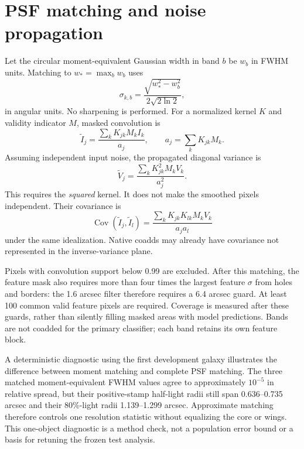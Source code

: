 \documentclass[10pt]{article}
\begin{document}
\section{PSF matching and noise propagation}
Let the circular moment-equivalent Gaussian width in band $b$ be $w_b$ in
FWHM units. Matching to $w_* =\max_b w_b$ uses
\begin{equation}
 \sigma_{k,b}=\frac{\sqrt{w_*^2-w_b^2}}{2\sqrt{2\ln2}},
\end{equation}
in angular units. No sharpening is performed. For a normalized kernel $K$
and validity indicator $M$, masked convolution is
\begin{equation}
 \widetilde I_j=\frac{\sum_k K_{jk}M_kI_k}{a_j},\qquad
 a_j=\sum_k K_{jk}M_k.
\end{equation}
Assuming independent input noise, the propagated diagonal variance is
\begin{equation}
 \widetilde V_j=\frac{\sum_kK_{jk}^2M_kV_k}{a_j^2}.
 \label{eq:variance}
\end{equation}
This requires the \emph{squared} kernel. It does not make the smoothed pixels
independent. Their covariance is
\begin{equation}
 \operatorname{Cov}(\widetilde I_j,\widetilde I_l)
 =\frac{\sum_k K_{jk}K_{lk}M_kV_k}{a_ja_l}
\end{equation}
under the same idealization. Native coadds may already have covariance not
represented in the inverse-variance plane.

Pixels with convolution support below 0.99 are excluded. After this matching,
the feature mask also requires more than four times the largest feature
$\sigma$ from holes and borders: the 1.6 arcsec filter therefore requires a
6.4 arcsec guard. At least 100 common valid feature pixels are required.
Coverage is measured after these guards, rather than silently filling masked
areas with model predictions. Bands are not coadded for the primary classifier;
each band retains its own feature block.

A deterministic diagnostic using the first development galaxy illustrates
the difference between moment matching and complete PSF matching. The three
matched moment-equivalent FWHM values agree to approximately $10^{-5}$ in
relative spread, but their positive-stamp half-light radii still span
0.636--0.735 arcsec and their 80\%-light radii 1.139--1.299 arcsec. Approximate
matching therefore controls one resolution statistic without equalizing the
core or wings. This one-object diagnostic is a method check, not a population
error bound or a basis for retuning the frozen test analysis.
\end{document}
